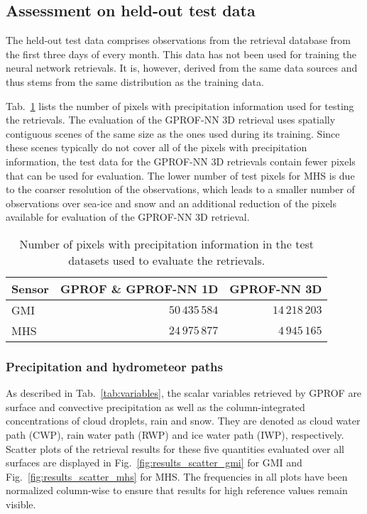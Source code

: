 \documentclass[journal abbreviation, manuscript]{copernicus}
\begin{document}
\subsection{Assessment on held-out test data}
\label{sec:results_test}

The held-out test data comprises observations from the retrieval database from the first three days of every month. This data has not been used for training the neural network retrievals. It is, however, derived from the same data sources and thus stems from the same distribution as the training data.

Tab.~\ref{tab:test_data} lists the number of pixels with precipitation information used for testing the retrievals. The evaluation of the GPROF-NN 3D retrieval uses spatially contiguous scenes of the same size as the ones used during its training. Since these scenes typically do not cover all of the pixels with precipitation information, the test data for the GPROF-NN 3D retrievals contain fewer pixels that can be used for evaluation. The lower number of test pixels for MHS is due to the coarser resolution of the observations, which leads to a smaller number of observations over sea-ice and snow and an additional reduction of the pixels available for evaluation of the GPROF-NN 3D retrieval.
\begin{table}[hbpt]
  \caption{
    Number of pixels with precipitation information in the test datasets
    used to evaluate the retrievals.
  }
  \label{tab:test_data}
  \begin{tabular}{|l||r|r|}
    \hline
    Sensor & GPROF \& GPROF-NN 1D & GPROF-NN 3D \\
    \hline
    \hline
    GMI & $50\,435\,584$ & $14\,218\,203$ \\
    \hline
    MHS & $24\,975\,877$ & $4\,945\,165$ \\
    \hline
  \end{tabular}
\end{table}


\subsubsection{Precipitation and hydrometeor paths}

As described in Tab.~\ref{tab:variables}, the scalar variables retrieved by
GPROF are surface and convective precipitation as well as the column-integrated
concentrations of cloud droplets, rain and snow. They are denoted as cloud water
path (CWP), rain water path (RWP) and ice water path (IWP), respectively.
Scatter plots of the retrieval results for these five quantities evaluated over all
surfaces are displayed in Fig.~\ref{fig:results_scatter_gmi} for GMI and
Fig.~\ref{fig:results_scatter_mhs} for MHS. The frequencies in all plots have
been normalized column-wise to ensure that results for high reference values
remain visible.
\end{document}

